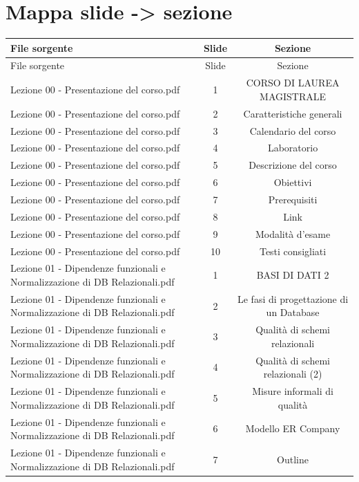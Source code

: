 \documentclass[11pt]{article}
\begin{document}
\section{Mappa slide -> sezione}
\begin{longtable}{@{}p{}cc@{}}
\toprule
File sorgente & Slide & Sezione \\
\midrule
\endfirsthead
\toprule
File sorgente & Slide & Sezione \\
\midrule
\endhead
Lezione 00 - Presentazione del corso.pdf & 1 & CORSO DI LAUREA MAGISTRALE \\
Lezione 00 - Presentazione del corso.pdf & 2 & Caratteristiche generali \\
Lezione 00 - Presentazione del corso.pdf & 3 & Calendario del corso \\
Lezione 00 - Presentazione del corso.pdf & 4 & Laboratorio \\
Lezione 00 - Presentazione del corso.pdf & 5 & Descrizione del corso \\
Lezione 00 - Presentazione del corso.pdf & 6 & Obiettivi \\
Lezione 00 - Presentazione del corso.pdf & 7 & Prerequisiti \\
Lezione 00 - Presentazione del corso.pdf & 8 & Link \\
Lezione 00 - Presentazione del corso.pdf & 9 & Modalità d'esame \\
Lezione 00 - Presentazione del corso.pdf & 10 & Testi consigliati \\
Lezione 01 - Dipendenze funzionali e Normalizzazione di DB Relazionali.pdf & 1 & BASI DI DATI 2 \\
Lezione 01 - Dipendenze funzionali e Normalizzazione di DB Relazionali.pdf & 2 & Le fasi di progettazione di un Database \\
Lezione 01 - Dipendenze funzionali e Normalizzazione di DB Relazionali.pdf & 3 & Qualità di schemi relazionali \\
Lezione 01 - Dipendenze funzionali e Normalizzazione di DB Relazionali.pdf & 4 & Qualità di schemi relazionali (2) \\
Lezione 01 - Dipendenze funzionali e Normalizzazione di DB Relazionali.pdf & 5 & Misure informali di qualità \\
Lezione 01 - Dipendenze funzionali e Normalizzazione di DB Relazionali.pdf & 6 & Modello ER Company \\
Lezione 01 - Dipendenze funzionali e Normalizzazione di DB Relazionali.pdf & 7 & Outline \\

\end{longtable}
\end{document}
